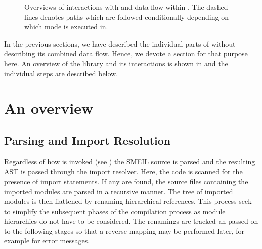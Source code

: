 \begin{figure}
{
  }
  \caption{Overviews of interactions with and data flow within \libsme{}. The
    dashed lines denotes paths which are followed conditionally depending on
    which mode \libsme{} is executed in.}
  \label{fig:overview}
\end{figure}

In the previous sections, we have described the individual parts of \libsme{}
without describing its combined data flow. Hence, we devote a section for that
purpose here. An overview of the \libsme{} library and its interactions is shown
in  and the individual steps are described below.

\section{An overview}

\subsection{Parsing and Import Resolution} Regardless of how \libsme{} is
invoked (see ) the SMEIL source is parsed and the resulting AST
is passed through the import resolver. Here, the code is scanned for the
presence of import statements. If any are found, the source files containing the
imported modules are parsed in a recursive manner. The tree of imported modules
is then flattened by renaming hierarchical references. This process seek to
simplify the subsequent phases of the compilation process as module hierarchies
do not have to be considered. The renamings are tracked an passed on to the
following stages so that a reverse mapping may be performed later, for example
for error messages.


